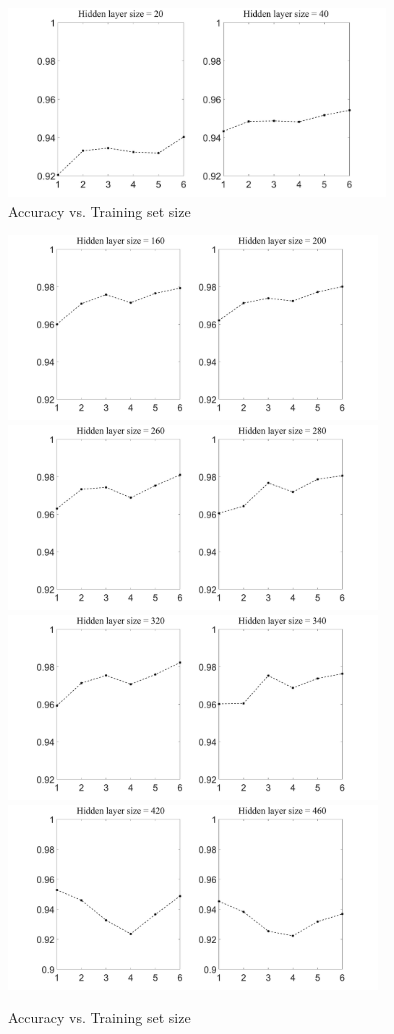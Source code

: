\documentclass[conference]{IEEEtran}
\begin{document}
\begin{subfigures}
\begin{figure}[tmbh]
\centering
\includegraphics[width=10cm]{AccuracyTSSize_A.pdf}
\caption{Accuracy vs. Training set size}
\label{figure:AccuracyTSSizeA}
\end{figure}
\begin{figure}[tmbh]
\centering
\includegraphics[width=9.8cm]{AccuracyTSSize_B.pdf}
\includegraphics[width=9.8cm]{AccuracyTSSize_C.pdf}
\includegraphics[width=9.8cm]{AccuracyTSSize_D.pdf}
\includegraphics[width=9.8cm]{fig2ilu_b.pdf}
\caption{Accuracy vs. Training set size}
\label{figure:AccuracyTSSizeB}
\end{figure}
\end{subfigures}
\end{document}
